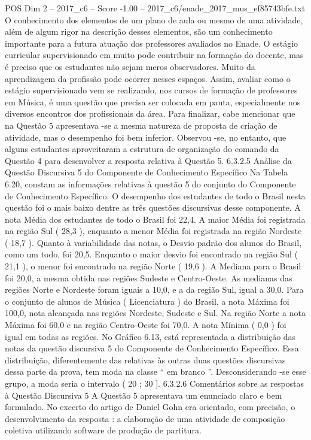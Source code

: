 \begin{textsample}{POS Dim 2 – 2017\_c6 – Score -1.00 – 2017\_c6/enade\_2017\_mus\_ef85743bfe.txt}
O conhecimento dos elementos de um plano de aula ou mesmo de uma atividade, além de algum rigor na descrição desses elementos, são um conhecimento importante para a futura atuação dos professores avaliados no Enade.
O estágio curricular supervisionado em muito pode contribuir na formação do docente, mas é preciso que os estudantes não sejam meros observadores.
Muito da aprendizagem da profissão pode ocorrer nesses espaços.
Assim, avaliar como o estágio supervisionado vem se realizando, nos cursos de formação de professores em Música, é uma questão que precisa ser colocada em pauta, especialmente nos diversos encontros dos profissionais da área.
Para finalizar, cabe mencionar que na Questão 5 apresentava -se a mesma natureza de proposta de criação de atividade, mas o desempenho foi bem inferior.
Observou -se, no entanto, que alguns estudantes aproveitaram a estrutura de organização do comando da Questão 4 para desenvolver a resposta relativa à Questão 5. 6.3.2.5 Análise da Questão Discursiva 5 do Componente de Conhecimento Específico Na Tabela 6.20, constam as informações relativas à questão 5 do conjunto do Componente de Conhecimento Específico.
O desempenho dos estudantes de todo o Brasil nesta questão foi o mais baixo dentre as três questões discursivas desse componente.
A nota Média dos estudantes de todo o Brasil foi 22,4.
A maior Média foi registrada na região Sul ( 28,3 ), enquanto a menor Média foi registrada na região Nordeste ( 18,7 ).
Quanto à variabilidade das notas, o Desvio padrão dos alunos do Brasil, como um todo, foi 20,5.
Enquanto o maior desvio foi encontrado na região Sul ( 21,1 ), o menor foi encontrado na região Norte ( 19,6 ).
A Mediana para o Brasil foi 20,0, a mesma obtida nas regiões Sudeste e Centro-Oeste.
As medianas das regiões Norte e Nordeste foram iguais a 10,0, e a da região Sul, igual a 30,0.
Para o conjunto de alunos de Música ( Licenciatura ) do Brasil, a nota Máxima foi 100,0, nota alcançada nas regiões Nordeste, Sudeste e Sul.
Na região Norte a nota Máxima foi 60,0 e na região Centro-Oeste foi 70,0.
A nota Mínima ( 0,0 ) foi igual em todas as regiões.
No Gráfico 6.13, está representada a distribuição das notas da questão discursiva 5 do Componente de Conhecimento Específico.
Essa distribuição, diferentemente das relativas às outras duas questões discursivas dessa parte da prova, tem moda na classe “ em branco ”.
Desconsiderando -se esse grupo, a moda seria o intervalo ( 20 ; 30 ]. 6.3.2.6 Comentários sobre as respostas à Questão Discursiva 5 A Questão 5 apresentava um enunciado claro e bem formulado.
No excerto do artigo de Daniel Gohn era orientado, com precisão, o desenvolvimento da resposta : a elaboração de uma atividade de composição coletiva utilizando software de produção de partitura.

\end{textsample}
